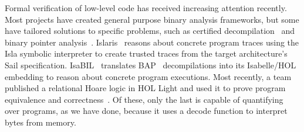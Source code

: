 {    


    Formal verification of low-level code has received increasing attention recently.
    Most projects have created general purpose binary analysis frameworks, but some have tailored solutions to specific problems, such as certified decompilation~\cite{formally_verified_lifting} and binary pointer analysis~\cite{verified_pointers}.
    Islaris~\cite{islaris} reasons about concrete program traces using the Isla symbolic interpreter to create trusted traces from the target architecture's Sail specification.
    IsaBIL~\cite{isabil} translates BAP~\cite{bap} decompilations into its Isabelle/HOL embedding to reason about concrete program executions.
    Most recently, a team published a relational Hoare logic in HOL Light and used it to prove program equivalence and correctness~\cite{relational_realistic}.
    Of these, only the last is capable of quantifying over programs, as we have done, because it uses a decode function to interpret bytes from memory.


}